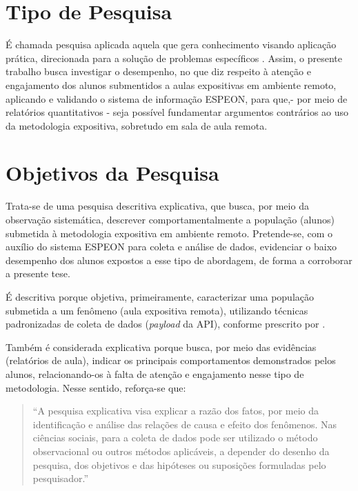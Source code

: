\section{Tipo de Pesquisa}
É chamada pesquisa aplicada aquela que gera conhecimento visando aplicação prática, direcionada para a solução de problemas específicos \cite{sienaMetodologiaPesquisaCientifica2024}. Assim, o presente trabalho busca investigar o desempenho, no que diz respeito à atenção e engajamento dos alunos submentidos a aulas expositivas em ambiente remoto, aplicando e validando o sistema de informação ESPEON, para que,- por meio de relatórios quantitativos - seja possível fundamentar argumentos contrários ao uso da metodologia expositiva, sobretudo em sala de aula remota.

\section{Objetivos da Pesquisa}
Trata-se de uma pesquisa descritiva explicativa, que busca, por meio da observação sistemática, descrever comportamentalmente a população (alunos) submetida à metodologia expositiva em ambiente remoto. Pretende-se, com o auxílio do sistema ESPEON para coleta e análise de dados, evidenciar o baixo desempenho dos alunos expostos a esse tipo de abordagem, de forma a corroborar a presente tese.

É descritiva porque objetiva, primeiramente, caracterizar uma população submetida a um fenômeno (aula expositiva remota), utilizando técnicas padronizadas de coleta de dados (\textit{payload} da API), conforme prescrito por \cite{sienaMetodologiaPesquisaCientifica2024}.

Também é considerada explicativa porque busca, por meio das evidências (relatórios de aula), indicar os principais comportamentos demonstrados pelos alunos, relacionando-os à falta de atenção e engajamento nesse tipo de metodologia. Nesse sentido, reforça-se que:

\begin{quote}
    ``A pesquisa explicativa visa explicar a razão dos fatos, por meio da identificação e
    análise das relações de causa e efeito dos fenômenos. Nas ciências sociais, para a coleta de
    dados pode ser utilizado o método observacional ou outros métodos aplicáveis, a depender do
    desenho da pesquisa, dos objetivos e das hipóteses ou suposições formuladas pelo pesquisador.''
    \cite{sienaMetodologiaPesquisaCientifica2024}
\end{quote}

